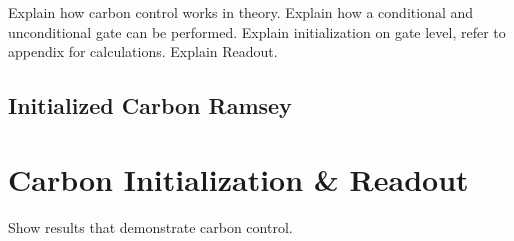 Explain how carbon control works in theory.
Explain how a conditional and unconditional gate can be performed.
Explain initialization on gate level, refer to appendix for calculations.
Explain Readout.

\subsection{Initialized Carbon Ramsey}


\section{Carbon Initialization \& Readout}
Show results that demonstrate carbon control.



